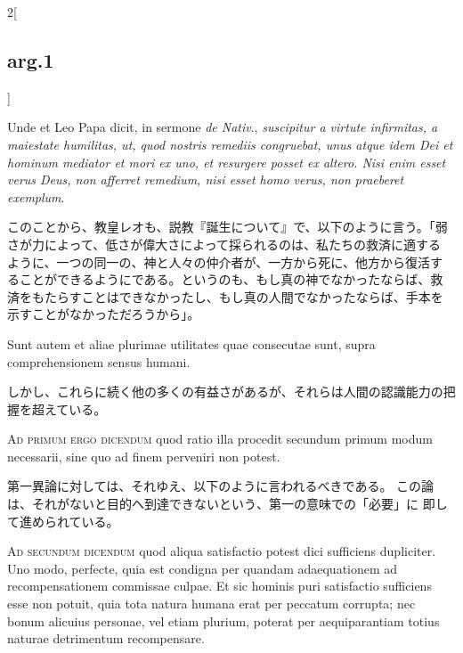 \documentclass[paper=a4paper,fontsize=10pt,jafontsize=9pt,titlepage]{jlreq}
\begin{document}
\begin{paracol}{2}[\subsection{arg.1}]
\switchcolumn*

Unde
 et Leo Papa dicit, in sermone {\itshape de Nativ}., {\itshape suscipitur a virtute
 infirmitas, a maiestate humilitas, ut, quod nostris remediis
 congruebat, unus atque idem Dei et hominum mediator et mori ex uno, et
 resurgere posset ex altero. Nisi enim esset verus Deus, non afferret
 remedium, nisi esset homo verus, non praeberet exemplum}.

\switchcolumn

このことから、教皇レオも、説教『誕生について』で、以下のように言う。「弱
 さが力によって、低さが偉大さによって採られるのは、私たちの救済に適する
 ように、一つの同一の、神と人々の仲介者が、一方から死に、他方から復活す
 ることができるようにである。というのも、もし真の神でなかったならば、救
 済をもたらすことはできなかったし、もし真の人間でなかったならば、手本を
 示すことがなかっただろうから」。

\switchcolumn*

Sunt autem et
 aliae plurimae utilitates quae consecutae sunt, supra comprehensionem
 sensus humani.

\switchcolumn

しかし、これらに続く他の多くの有益さがあるが、それらは人間の認識能力の把
 握を超えている。

\switchcolumn*[\subsection{ad.1}]

{\scshape Ad primum ergo dicendum} quod ratio illa procedit secundum primum modum necessarii, sine quo ad finem perveniri non potest.

\switchcolumn

第一異論に対しては、それゆえ、以下のように言われるべきである。
この論は、それがないと目的へ到達できないという、第一の意味での「必要」に
 即して進められている。

\switchcolumn*[\subsection{ad.2}]

{\scshape Ad secundum dicendum} quod aliqua satisfactio potest dici
 sufficiens dupliciter. Uno modo, perfecte, quia est condigna per
 quandam adaequationem ad recompensationem commissae culpae. Et sic
 hominis puri satisfactio sufficiens esse non potuit, quia tota natura
 humana erat per peccatum corrupta; nec bonum alicuius personae, vel
 etiam plurium, poterat per aequiparantiam totius naturae detrimentum
 recompensare.


\end{paracol}
\end{document}
